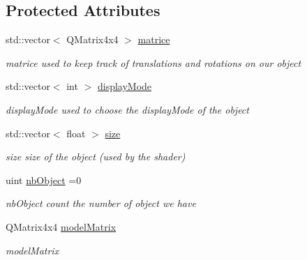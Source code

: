 \subsection*{Protected Attributes}
\begin{DoxyCompactItemize}
\item 
\mbox{\label{classmyObjects_aef3994db6f38f3abbd4863acdac0612c}} 
std\+::vector$<$ Q\+Matrix4x4 $>$ \hyperlink{classmyObjects_aef3994db6f38f3abbd4863acdac0612c}{matrice}
\begin{DoxyCompactList}\small\item\em matrice used to keep track of translations and rotations on our object \end{DoxyCompactList}\item 
\mbox{\label{classmyObjects_a0bdb1559971230bace7098dadc2d4ace}} 
std\+::vector$<$ int $>$ \hyperlink{classmyObjects_a0bdb1559971230bace7098dadc2d4ace}{display\+Mode}
\begin{DoxyCompactList}\small\item\em display\+Mode used to choose the display\+Mode of the object \end{DoxyCompactList}\item 
\mbox{\label{classmyObjects_ab522af7e49a03777cc176061c32db11c}} 
std\+::vector$<$ float $>$ \hyperlink{classmyObjects_ab522af7e49a03777cc176061c32db11c}{size}
\begin{DoxyCompactList}\small\item\em size size of the object (used by the shader) \end{DoxyCompactList}\item 
\mbox{\label{classmyObjects_a8485f5285f57ea2981327c4e8f9ba6fb}} 
uint \hyperlink{classmyObjects_a8485f5285f57ea2981327c4e8f9ba6fb}{nb\+Object} =0
\begin{DoxyCompactList}\small\item\em nb\+Object count the number of object we have \end{DoxyCompactList}\item 
\mbox{\label{classmyObjects_a32b18e774a2f2d51df99482e1bd308c3}} 
Q\+Matrix4x4 \hyperlink{classmyObjects_a32b18e774a2f2d51df99482e1bd308c3}{model\+Matrix}
\begin{DoxyCompactList}\small\item\em model\+Matrix \end{DoxyCompactList}\item 

\end{DoxyCompactItemize}
